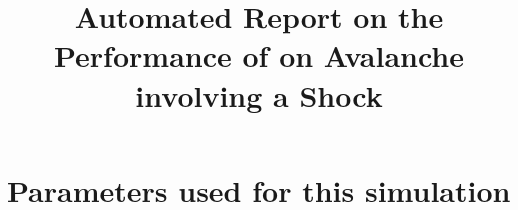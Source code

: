 \documentclass[11pt,a4paper]{article}
\begin{document}
 

\title{Automated Report on the Performance of \anuga{} on Avalanche involving a Shock}
\maketitle




\section{Parameters used for this simulation}





\end{document}
